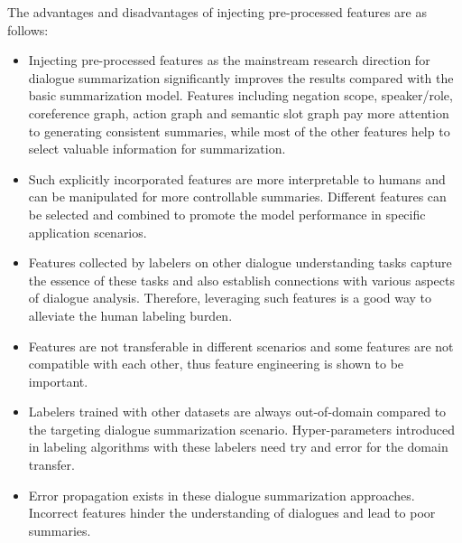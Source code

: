The advantages and disadvantages of injecting pre-processed features are as follows:
\begin{itemize}
    \item[\Checkmark] Injecting pre-processed features as the mainstream research direction for dialogue summarization significantly improves the results compared with the basic summarization model. Features including negation scope, speaker/role, coreference graph, action graph and semantic slot graph pay more attention to generating consistent summaries, while most of the other features help to select valuable information for summarization.
    \item[\Checkmark] Such explicitly incorporated features are more interpretable to humans and can be manipulated for more controllable summaries. Different features can be selected and combined to promote the model performance in specific application scenarios.
        \item[\Checkmark] Features collected by labelers on other dialogue understanding tasks capture the essence of these tasks and also establish connections with various aspects of dialogue analysis.  Therefore, leveraging such features is a good way to alleviate the human labeling burden.
	\item[\XSolidBrush] Features are not transferable in different scenarios and some features are not compatible with each other, thus feature engineering is shown to be important.
	\item[\XSolidBrush] Labelers trained with other datasets are always out-of-domain compared to the targeting dialogue summarization scenario. Hyper-parameters introduced in labeling algorithms with these labelers need try and error for the domain transfer. 
	\item[\XSolidBrush] Error propagation exists in these dialogue summarization approaches. Incorrect features hinder the understanding of dialogues and lead to poor summaries. 
\end{itemize}